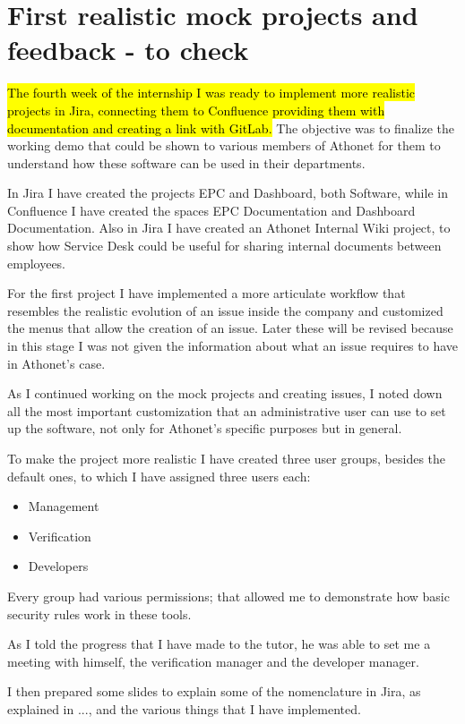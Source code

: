\section{First realistic mock projects and feedback - to check}
	
	\hl{The fourth week of the internship I was ready to implement more realistic projects in Jira, connecting them to Confluence providing them with documentation and creating a link with GitLab.}
	The objective was to finalize the working demo that could be shown to various members of Athonet for them to understand how these software can be used in their departments.

	In Jira I have created the projects EPC and Dashboard, both Software, while in Confluence I have created the spaces EPC Documentation and Dashboard Documentation.
	Also in Jira I have created an Athonet Internal Wiki project, to show how Service Desk could be useful for sharing internal documents between employees.
	
	For the first project I have implemented a more articulate workflow that resembles the realistic evolution of an issue inside the company and customized the menus that allow the creation of an issue.
	Later these will be revised because in this stage I was not given the information about what an issue requires to have in Athonet's case. 
	
	As I continued working on the mock projects and creating issues, I noted down all the most important customization that an administrative user can use to set up the software, not only for Athonet's specific purposes but in general.
	
	To make the project more realistic I have created three user groups, besides the default ones, to which I have assigned three users each:
	\begin{itemize}
		\item Management
		\item Verification
		\item Developers
	\end{itemize}
	
	Every group had various permissions; that allowed me to demonstrate how basic security rules work in these tools.
	
	As I told the progress that I have made to the tutor, he was able to set me a meeting with himself, the verification manager and the developer manager.
	
	I then prepared some slides to explain some of the nomenclature in Jira, as explained in ..., and the various things that I have implemented.
	
